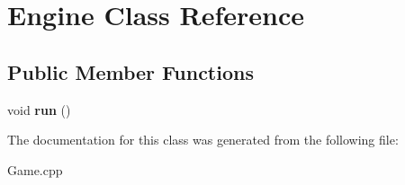 \hypertarget{class_engine}{}\section{Engine Class Reference}
\label{class_engine}
\subsection*{Public Member Functions}
\begin{DoxyCompactItemize}
\item 
\mbox{\label{class_engine_a1a210cf30d6bd330b3649439ecd6d6cc}} 
void {\bfseries run} ()
\end{DoxyCompactItemize}


The documentation for this class was generated from the following file\+:\begin{DoxyCompactItemize}
\item 
Game.\+cpp\end{DoxyCompactItemize}
